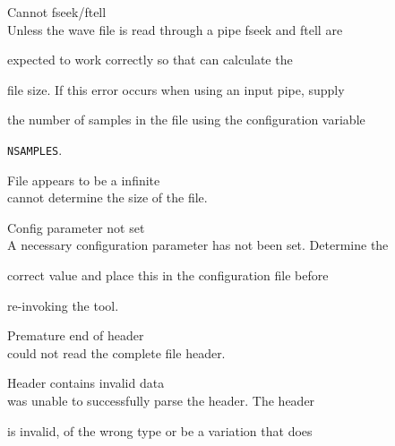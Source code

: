 \begin{itemize}
\begin{itemize}
\end{itemize}










\begin{itemize}


    Cannot fseek/ftell\\


        Unless the wave file is read through a pipe fseek and ftell are 


        expected to work correctly so that  can calculate the 


        file size.  If this error occurs when using an input pipe, supply 


        the number of samples in the file using the configuration variable


        \texttt{NSAMPLES}.





    File appears to be a infinite\\


         cannot determine the size of the file.





    Config parameter not set\\


        A necessary configuration parameter has not been set.  Determine the 


        correct value and place this in the configuration file before 


        re-invoking the tool.





    Premature end of header\\


         could not read the complete file header.





    Header contains invalid data\\


         was unable to successfully parse the header.  The header


        is invalid, of the wrong type or be a variation that  does



\end{itemize}
\end{itemize}
